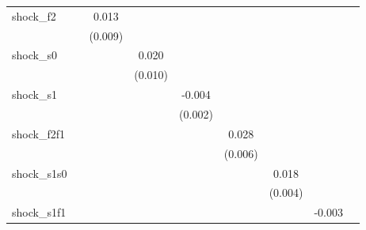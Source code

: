 {\begin{tabular}{l*{8}{c}}
\addlinespace
shock\_f2    &                     &       0.013         &                     &                     &                     &                     &                     &                     \\
            &                     &     (0.009)         &                     &                     &                     &                     &                     &                     \\
\addlinespace
shock\_s0    &                     &                     &       0.020\sym{*}  &                     &                     &                     &                     &                     \\
            &                     &                     &     (0.010)         &                     &                     &                     &                     &                     \\
\addlinespace
shock\_s1    &                     &                     &                     &      -0.004\sym{**} &                     &                     &                     &                     \\
            &                     &                     &                     &     (0.002)         &                     &                     &                     &                     \\
\addlinespace
shock\_f2f1  &                     &                     &                     &                     &       0.028\sym{***}&                     &                     &                     \\
            &                     &                     &                     &                     &     (0.006)         &                     &                     &                     \\
\addlinespace
shock\_s1s0  &                     &                     &                     &                     &                     &       0.018\sym{***}&                     &                     \\
            &                     &                     &                     &                     &                     &     (0.004)         &                     &                     \\
\addlinespace
shock\_s1f1  &                     &                     &                     &                     &                     &                     &      -0.003         &                     \\

\end{tabular}}

